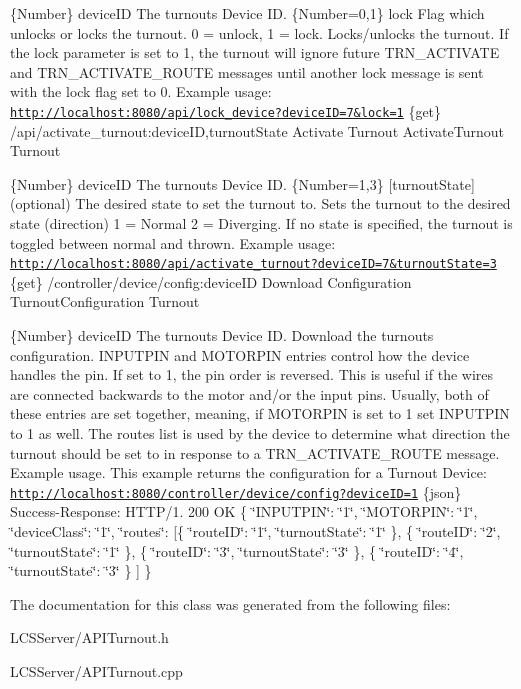 \{Number\} device\+ID The turnout\textquotesingle{}s Device ID.  \{Number=0,1\} lock Flag which unlocks or locks the turnout. 0 = unlock, 1 = lock.  Locks/unlocks the turnout. If the lock parameter is set to 1, the turnout will ignore future T\+R\+N\+\_\+\+A\+C\+T\+I\+V\+A\+TE and T\+R\+N\+\_\+\+A\+C\+T\+I\+V\+A\+T\+E\+\_\+\+R\+O\+U\+TE messages until another lock message is sent with the lock flag set to 0.  Example usage\+: \href{http://localhost:8080/api/lock_device?deviceID=7&lock=1}{\tt http\+://localhost\+:8080/api/lock\+\_\+device?device\+I\+D=7\&lock=1}  \{get\} /api/activate\+\_\+turnout\+:device\+ID,turnout\+State Activate Turnout  Activate\+Turnout  Turnout

\{Number\} device\+ID The turnout\textquotesingle{}s Device ID.  \{Number=1,3\} \mbox{[}turnout\+State\mbox{]} (optional) The desired state to set the turnout to.  Sets the turnout to the desired state (direction) 1 = Normal 2 = Diverging. If no state is specified, the turnout is toggled between normal and thrown.  Example usage\+: \href{http://localhost:8080/api/activate_turnout?deviceID=7&turnoutState=3}{\tt http\+://localhost\+:8080/api/activate\+\_\+turnout?device\+I\+D=7\&turnout\+State=3}  \{get\} /controller/device/config\+:device\+ID Download Configuration  Turnout\+Configuration  Turnout

\{Number\} device\+ID The turnout\textquotesingle{}s Device ID.  Download the turnout\textquotesingle{}s configuration. I\+N\+P\+U\+T\+P\+IN and M\+O\+T\+O\+R\+P\+IN entries control how the device handles the pin. If set to 1, the pin order is reversed. This is useful if the wires are connected backwards to the motor and/or the input pins. Usually, both of these entries are set together, meaning, if M\+O\+T\+O\+R\+P\+IN is set to 1 set I\+N\+P\+U\+T\+P\+IN to 1 as well. The routes list is used by the device to determine what direction the turnout should be set to in response to a T\+R\+N\+\_\+\+A\+C\+T\+I\+V\+A\+T\+E\+\_\+\+R\+O\+U\+TE message.  Example usage. This example returns the configuration for a Turnout Device\+: \href{http://localhost:8080/controller/device/config?deviceID=1}{\tt http\+://localhost\+:8080/controller/device/config?device\+I\+D=1}  \{json\} Success-\/\+Response\+: H\+T\+T\+P/1. 200 OK \{ \char`\"{}\+I\+N\+P\+U\+T\+P\+I\+N\char`\"{}\+: \char`\"{}1\char`\"{}, \char`\"{}\+M\+O\+T\+O\+R\+P\+I\+N\char`\"{}\+: \char`\"{}1\char`\"{}, \char`\"{}device\+Class\char`\"{}\+: \char`\"{}1\char`\"{}, \char`\"{}routes\char`\"{}\+: \mbox{[}\{ \char`\"{}route\+I\+D\char`\"{}\+: \char`\"{}1\char`\"{}, \char`\"{}turnout\+State\char`\"{}\+: \char`\"{}1\char`\"{} \}, \{ \char`\"{}route\+I\+D\char`\"{}\+: \char`\"{}2\char`\"{}, \char`\"{}turnout\+State\char`\"{}\+: \char`\"{}1\char`\"{} \}, \{ \char`\"{}route\+I\+D\char`\"{}\+: \char`\"{}3\char`\"{}, \char`\"{}turnout\+State\char`\"{}\+: \char`\"{}3\char`\"{} \}, \{ \char`\"{}route\+I\+D\char`\"{}\+: \char`\"{}4\char`\"{}, \char`\"{}turnout\+State\char`\"{}\+: \char`\"{}3\char`\"{} \} \mbox{]} \} 

The documentation for this class was generated from the following files\+:\begin{DoxyCompactItemize}
\item 
L\+C\+S\+Server/A\+P\+I\+Turnout.\+h\item 
L\+C\+S\+Server/A\+P\+I\+Turnout.\+cpp\end{DoxyCompactItemize}
